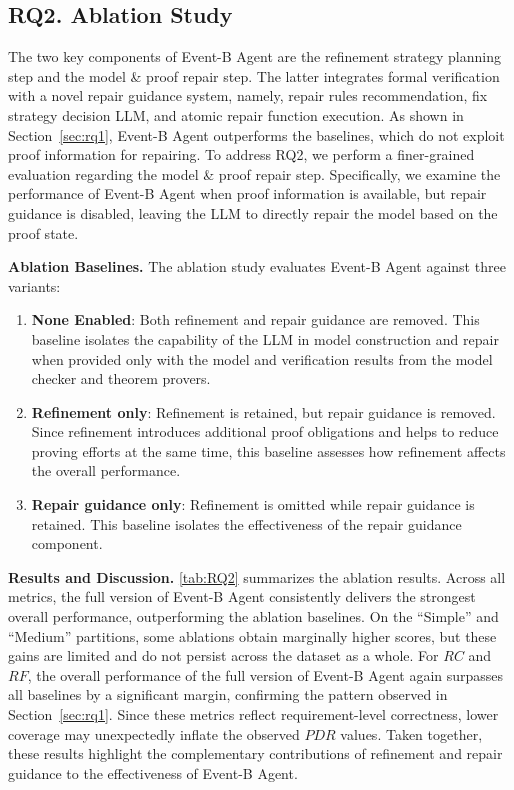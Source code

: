 

\subsection{RQ2. Ablation Study}

The two key components of Event-B Agent are the refinement strategy planning step and the model \& proof repair step.
The latter integrates formal verification with a novel repair guidance system, namely, repair rules recommendation, fix strategy decision LLM, and atomic repair function execution.
As shown in Section~\ref{sec:rq1}, Event-B Agent outperforms the baselines, which do not exploit proof information for repairing.
To address RQ2, we perform a finer-grained evaluation regarding the model \& proof repair step.
Specifically, we examine the performance of Event-B Agent when proof information is available, but repair guidance is disabled, leaving the LLM to directly repair the model based on the proof state.

\noindent
\textbf{Ablation Baselines.}
The ablation study evaluates Event-B Agent against three variants:
\begin{enumerate}
    \item \textbf{None Enabled}: Both refinement and repair guidance are removed. This baseline isolates the capability of the LLM in model construction and repair when provided only with the model and verification results from the model checker and theorem provers.  
    \item \textbf{Refinement only}: Refinement is retained, but repair guidance is removed. Since refinement introduces additional proof obligations and helps to reduce proving efforts at the same time, this baseline assesses how refinement affects the overall performance.
    \item \textbf{Repair guidance only}: Refinement is omitted while repair guidance is retained. This baseline isolates the effectiveness of the repair guidance component.  
\end{enumerate}

\noindent
\textbf{Results and Discussion.}
\autoref{tab:RQ2} summarizes the ablation results. 
Across all metrics, the full version of Event-B Agent consistently delivers the strongest overall performance, outperforming the ablation baselines. 
On the ``Simple'' and ``Medium'' partitions, some ablations obtain marginally higher scores, but these gains are limited and do not persist across the dataset as a whole.
For $RC$ and $RF$, the overall performance of the full version of Event-B Agent again surpasses all baselines by a significant margin, confirming the pattern observed in Section~\ref{sec:rq1}. 
Since these metrics reflect requirement-level correctness, lower coverage may unexpectedly inflate the observed $PDR$ values.
Taken together, these results highlight the complementary contributions of refinement and repair guidance to the effectiveness of Event-B Agent.

